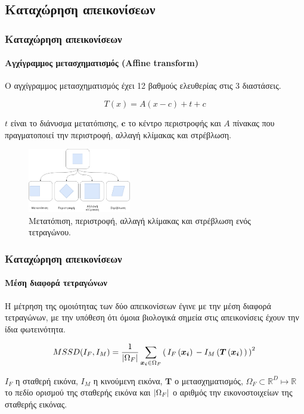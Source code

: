 \documentclass{beamer}
\DeclarePairedDelimiter\abs{\lvert}{\rvert}
\newcommand{\R}{\mathbb{R}}
\begin{document}
\subsection{Καταχώρηση απεικονίσεων}


\begin{frame}
\frametitle{Καταχώρηση απεικονίσεων}
\framesubtitle{Αγχίγραμμος μετασχηματισμός (Affine transform)}

Ο αγχίγραμμος μετασχηματισμός έχει 12 βαθμούς ελευθερίας στις 3 διαστάσεις.

\begin{equation*}
    T(x) = A(x - c) + t + c
\end{equation*}

$t$ είναι το διάνυσμα μετατόπισης, $\bm{c}$ το κέντρο περιστροφής και $A$
πίνακας που πραγματοποιεί την περιστροφή, αλλαγή κλίμακας και στρέβλωση.

\begin{figure}[H]
    \centering
    \includegraphics[width=0.4\textwidth]{affine_2}
    \captionsetup{width=0.7\textwidth}
    \caption{Μετατόπιση, περιστροφή, αλλαγή κλίμακας και στρέβλωση ενός
    τετραγώνου.}
\end{figure}

\end{frame}


\begin{frame}
\frametitle{Καταχώρηση απεικονίσεων}
\framesubtitle{Μέση διαφορά τετραγώνων}

Η μέτρηση της ομοιότητας των δύο απεικονίσεων έγινε με την μέση διαφορά
τετραγώνων, με την υπόθεση ότι όμοια βιολογικά σημεία στις απεικονίσεις έχουν
την ίδια φωτεινότητα.

\begin{equation*}
    MSSD(I_F, I_M) = \frac {1} {\abs{\Omega_F}} \sum_{\bm{x_i} \in \Omega_F} 
        \left(\, {I_F\left(\bm{x_i}\right)\, - 
                  I_M\left(\bm{T}\left(\bm{x_i}\right)\,\right)\,}
        \right)^2\, 
\end{equation*}

$I_F$ η σταθερή εικόνα, $I_M$ η κινούμενη εικόνα, $\bm{T}$ ο μετασχηματισμός,
$\Omega_F \subset \R^D \mapsto \R$ το πεδίο ορισμού της σταθερής εικόνα και
$\abs{\Omega_F}$ ο αριθμός την εικονοστοιχείων της σταθερής εικόνας.


\end{frame}
\end{document}
